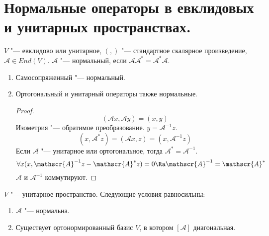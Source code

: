 \section{Нормальные операторы в евклидовых и унитарных пространствах.}

\begin{Def}
	$V$ "--- евклидово или унитарное, $(,)$ "--- стандартное скалярное произведение, $\mathscr A \in End(V)$.
	$\mathscr A$ "--- нормальный, если $\mathscr A \mathscr{A}^* = \mathscr{A}^*\mathscr A$.
\end{Def}

\begin{exmp}
	\begin{enumerate}
		\item Самосопряженный "--- нормальный.
		\item Ортогональный и унитарный операторы также нормальные.
		\begin{proof}
			\[ (\mathscr Ax, \mathscr Ay) = (x, y) \]
			Изометрия "--- обратимое преобразование.
			$y = \mathscr{A}^{-1}z$.
			\[ (x, \mathscr{A}^*z) = (\mathscr Ax, z) = (x, \mathscr{A}^{-1}z) \]
			Если $\mathscr A$ "--- унитарное или ортогональное, тогда $\mathscr{A}^* = \mathscr{A}^{-1}$.
			\[ \forall x (x, \mathscr{A}^{-1}z - \mathscr{A}^*z) = 0 \Ra \mathscr{A}^{-1} = \mathscr{A}^* \]
			$\mathscr A$ и $\mathscr{A}^{-1}$ коммутируют.
		\end{proof}
	\end{enumerate}
\end{exmp}

\begin{theorem}
	$V$ "--- унитарное пространство.
	Следующие условия равносильны:
	\begin{enumerate}
		\item $\mathscr A$ "--- нормальна.
		\item Существует ортонормированный базис $V$, в котором $[\mathscr A]$ диагональная.
	\end{enumerate}
\end{theorem}

